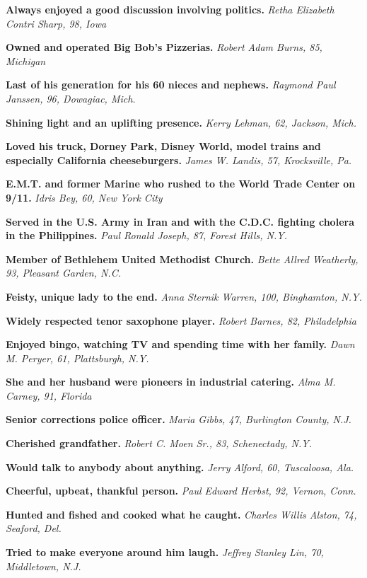 \textbf{Always enjoyed a good discussion involving politics.}
\emph{Retha Elizabeth Contri Sharp, 98, Iowa}

\textbf{Owned and operated Big Bob's Pizzerias.} \emph{Robert Adam
Burns, 85, Michigan}

\textbf{Last of his generation for his 60 nieces and nephews.}
\emph{Raymond Paul Janssen, 96, Dowagiac, Mich.}

\textbf{Shining light and an uplifting presence.} \emph{Kerry Lehman,
62, Jackson, Mich.}

\textbf{Loved his truck, Dorney Park, Disney World, model trains and
especially California cheeseburgers.} \emph{James W. Landis, 57,
Krocksville, Pa.}

\textbf{E.M.T. and former Marine who rushed to the World Trade Center on
9/11.} \emph{Idris Bey, 60, New York City}

\textbf{Served in the U.S. Army in Iran and with the C.D.C. fighting
cholera in the Philippines.} \emph{Paul Ronald Joseph, 87, Forest Hills,
N.Y.}

\textbf{Member of Bethlehem United Methodist Church.} \emph{Bette Allred
Weatherly, 93, Pleasant Garden, N.C.}

\textbf{Feisty, unique lady to the end.} \emph{Anna Sternik Warren, 100,
Binghamton, N.Y.}

\textbf{Widely respected tenor saxophone player.} \emph{Robert Barnes,
82, Philadelphia}

\textbf{Enjoyed bingo, watching TV and spending time with her family.}
\emph{Dawn M. Peryer, 61, Plattsburgh, N.Y.}

\textbf{She and her husband were pioneers in industrial catering.}
\emph{Alma M. Carney, 91, Florida}

\textbf{Senior corrections police officer.} \emph{Maria Gibbs, 47,
Burlington County, N.J.}

\textbf{Cherished grandfather.} \emph{Robert C. Moen Sr., 83,
Schenectady, N.Y.}

\textbf{Would talk to anybody about anything.} \emph{Jerry Alford, 60,
Tuscaloosa, Ala.}

\textbf{Cheerful, upbeat, thankful person.} \emph{Paul Edward Herbst,
92, Vernon, Conn.}

\textbf{Hunted and fished and cooked what he caught.} \emph{Charles
Willis Alston, 74, Seaford, Del.}

\textbf{Tried to make everyone around him laugh.} \emph{Jeffrey Stanley
Lin, 70, Middletown, N.J.}

